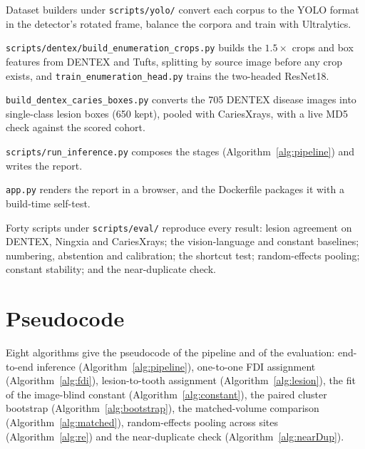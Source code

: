 \begin{description}[leftmargin=0pt,style=nextline]
\item[Module 7: Tooth detector.] Dataset builders under \texttt{scripts/yolo/} convert each corpus to
  the YOLO format in the detector's rotated frame, balance the corpora and train with Ultralytics.
\item[Module 8: Numbering head.] \texttt{scripts/dentex/build\_enumeration\_crops.py} builds the
  $1.5\times$ crops and box features from DENTEX and Tufts, splitting by source image before any crop
  exists, and \texttt{train\_enumeration\_head.py} trains the two-headed ResNet18.
\item[Module 9: Lesion detector.] \texttt{build\_dentex\_caries\_boxes.py} converts the 705 DENTEX
  disease images into single-class lesion boxes (650 kept), pooled with CariesXrays, with a live MD5
  check against the scored cohort.
\item[Module 10: Integration.] \texttt{scripts/run\_inference.py} composes the stages
  (Algorithm~\ref{alg:pipeline}) and writes the report.
\item[Module 11: Web demo and container.] \texttt{app.py} renders the report in a browser, and the
  Dockerfile packages it with a build-time self-test.
\item[Module 12: Evaluation suite.] Forty scripts under \texttt{scripts/eval/} reproduce every result:
  lesion agreement on DENTEX, Ningxia and CariesXrays; the vision-language and constant baselines;
  numbering, abstention and calibration; the shortcut test; random-effects pooling; constant
  stability; and the near-duplicate check.
\end{description}

\section{Pseudocode}

Eight algorithms give the pseudocode of the pipeline and of the evaluation: end-to-end inference
(Algorithm~\ref{alg:pipeline}), one-to-one FDI assignment (Algorithm~\ref{alg:fdi}), lesion-to-tooth
assignment (Algorithm~\ref{alg:lesion}), the fit of the image-blind constant
(Algorithm~\ref{alg:constant}), the paired cluster bootstrap (Algorithm~\ref{alg:bootstrap}), the
matched-volume comparison (Algorithm~\ref{alg:matched}), random-effects pooling across sites
(Algorithm~\ref{alg:re}) and the near-duplicate check (Algorithm~\ref{alg:nearDup}).

